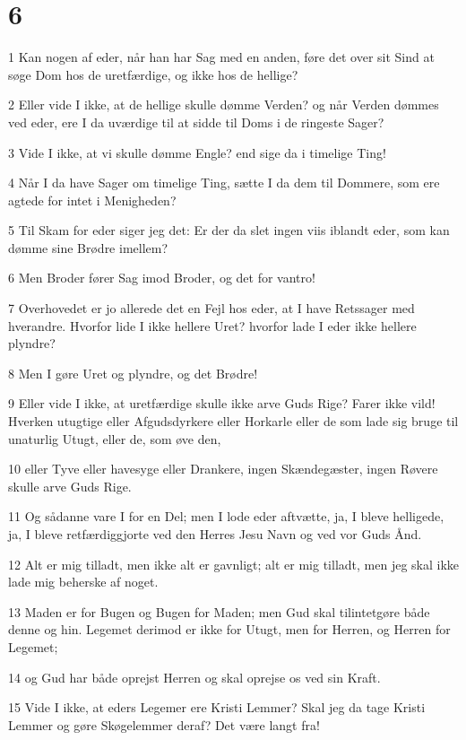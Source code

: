 \chapter{6}

\par 1 Kan nogen af eder, når han har Sag med en anden, føre det over sit Sind at søge Dom hos de uretfærdige, og ikke hos de hellige?
\par 2 Eller vide I ikke, at de hellige skulle dømme Verden? og når Verden dømmes ved eder, ere I da uværdige til at sidde til Doms i de ringeste Sager?
\par 3 Vide I ikke, at vi skulle dømme Engle? end sige da i timelige Ting!
\par 4 Når I da have Sager om timelige Ting, sætte I da dem til Dommere, som ere agtede for intet i Menigheden?
\par 5 Til Skam for eder siger jeg det: Er der da slet ingen viis iblandt eder, som kan dømme sine Brødre imellem?
\par 6 Men Broder fører Sag imod Broder, og det for vantro!
\par 7 Overhovedet er jo allerede det en Fejl hos eder, at I have Retssager med hverandre. Hvorfor lide I ikke hellere Uret? hvorfor lade I eder ikke hellere plyndre?
\par 8 Men I gøre Uret og plyndre, og det Brødre!
\par 9 Eller vide I ikke, at uretfærdige skulle ikke arve Guds Rige? Farer ikke vild! Hverken utugtige eller Afgudsdyrkere eller Horkarle eller de som lade sig bruge til unaturlig Utugt, eller de, som øve den,
\par 10 eller Tyve eller havesyge eller Drankere, ingen Skændegæster, ingen Røvere skulle arve Guds Rige.
\par 11 Og sådanne vare I for en Del; men I lode eder aftvætte, ja, I bleve helligede, ja, I bleve retfærdiggjorte ved den Herres Jesu Navn og ved vor Guds Ånd.
\par 12 Alt er mig tilladt, men ikke alt er gavnligt; alt er mig tilladt, men jeg skal ikke lade mig beherske af noget.
\par 13 Maden er for Bugen og Bugen for Maden; men Gud skal tilintetgøre både denne og hin. Legemet derimod er ikke for Utugt, men for Herren, og Herren for Legemet;
\par 14 og Gud har både oprejst Herren og skal oprejse os ved sin Kraft.
\par 15 Vide I ikke, at eders Legemer ere Kristi Lemmer? Skal jeg da tage Kristi Lemmer og gøre Skøgelemmer deraf? Det være langt fra!
